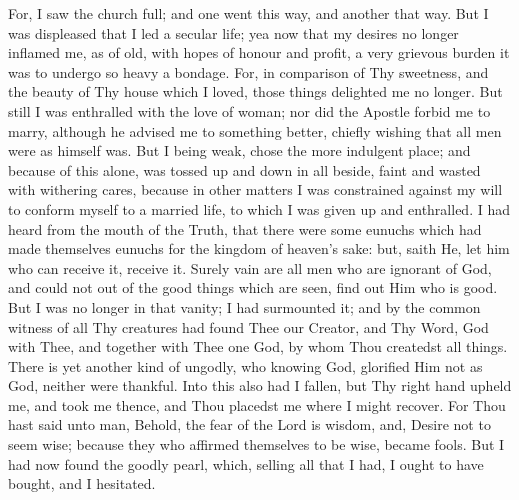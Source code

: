 \documentclass[b5paper,openright,12pt,twoside]{book}
\begin{document}
For, I saw the church full; and one went this way, and another that way.
But I was displeased that I led a secular life; yea now that my desires
no longer inflamed me, as of old, with hopes of honour and profit,
a very grievous burden it was to undergo so heavy a bondage. For, in
comparison of Thy sweetness, and the beauty of Thy house which I loved,
those things delighted me no longer. But still I was enthralled with
the love of woman; nor did the Apostle forbid me to marry, although he
advised me to something better, chiefly wishing that all men were as
himself was. But I being weak, chose the more indulgent place; and
because of this alone, was tossed up and down in all beside, faint and
wasted with withering cares, because in other matters I was constrained
against my will to conform myself to a married life, to which I was
given up and enthralled. I had heard from the mouth of the Truth,
that there were some eunuchs which had made themselves eunuchs for the
kingdom of heaven's sake: but, saith He, let him who can receive it,
receive it. Surely vain are all men who are ignorant of God, and could
not out of the good things which are seen, find out Him who is good. But
I was no longer in that vanity; I had surmounted it; and by the common
witness of all Thy creatures had found Thee our Creator, and Thy Word,
God with Thee, and together with Thee one God, by whom Thou createdst
all things. There is yet another kind of ungodly, who knowing God,
glorified Him not as God, neither were thankful. Into this also had
I fallen, but Thy right hand upheld me, and took me thence, and Thou
placedst me where I might recover. For Thou hast said unto man, Behold,
the fear of the Lord is wisdom, and, Desire not to seem wise; because
they who affirmed themselves to be wise, became fools. But I had now
found the goodly pearl, which, selling all that I had, I ought to have
bought, and I hesitated.
\end{document}
